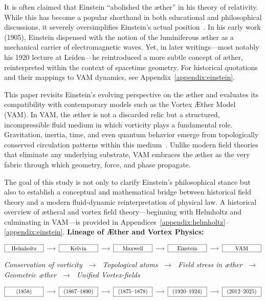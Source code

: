 \documentclass[preprint,notitlepage]{revtex4-2}
\begin{document}
It is often claimed that Einstein ``abolished the æther'' in his theory of relativity. While this has become a popular shorthand in both educational and philosophical discussions, it severely oversimplifies Einstein's actual position~\cite{einstein1920aether}. In his early work (1905), Einstein dispensed with the notion of the luminiferous æther as a mechanical carrier of electromagnetic waves. Yet, in later writings—most notably his 1920 lecture at Leiden—he reintroduced a more subtle concept of æther, reinterpreted within the context of spacetime geometry.
For historical quotations and their mappings to VAM dynamics, see Appendix~\ref{appendix:einstein}.


This paper revisits Einstein’s evolving perspective on the æther and evaluates its compatibility with contemporary models such as the Vortex Æther Model (VAM). In VAM, the æther is not a discarded relic but a structured, incompressible fluid medium in which vorticity plays a fundamental role. Gravitation, inertia, time, and even quantum behavior emerge from topologically conserved circulation patterns within this medium~\cite{iskandarani2025vam1, iskandarani2025vam2}. Unlike modern field theories that eliminate any underlying substrate, VAM embraces the æther as the very fabric through which geometry, force, and phase propagate.

The goal of this study is not only to clarify Einstein's philosophical stance but also to establish a conceptual and mathematical bridge between historical field theory and a modern fluid-dynamic reinterpretation of physical law. A historical overview of ætheral and vortex field theory—beginning with Helmholtz and culminating in VAM—is provided in Appendices~\ref{appendix:helmholtz}–\ref{appendix:einstein}.
\vspace{1em}
\noindent\textbf{Lineage of Æther and Vortex Physics:}

\[
\fbox{\makebox[2.2cm][c]{Helmholtz}} \;\longrightarrow\;
\fbox{\makebox[2.2cm][c]{Kelvin}} \;\longrightarrow\;
\fbox{\makebox[2.2cm][c]{Maxwell}} \;\longrightarrow\;
\fbox{\makebox[2.2cm][c]{Einstein}} \;\longrightarrow\;
\fbox{\makebox[2.2cm][c]{VAM}}
\]

\begin{center}
\scriptsize
\textit{
Conservation of vorticity $\;\rightarrow\;$ Topological atoms $\;\rightarrow\;$ Field stress in æther $\;\rightarrow\;$ Geometric æther $\;\rightarrow\;$ Unified Vortex-fields
}
\end{center}
\[
\fbox{\makebox[2.2cm][c]{(1858)}} \;\longrightarrow\;
\fbox{\makebox[2.2cm][c]{(1867--1890)}} \;\longrightarrow\;
\fbox{\makebox[2.2cm][c]{(1875--1878)}} \;\longrightarrow\;
\fbox{\makebox[2.2cm][c]{(1920--1924)}} \;\longrightarrow\;
\fbox{\makebox[2.2cm][c]{(2012--2025)}}
\]
\end{document}
